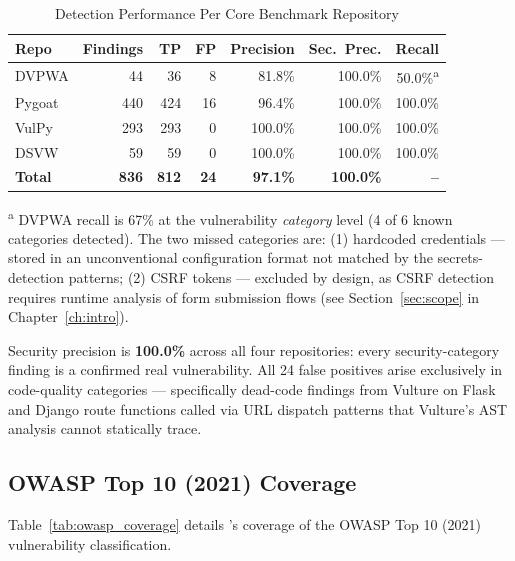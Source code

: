 \begin{table}[htbp]
\caption{Detection Performance Per Core Benchmark Repository}
\label{tab:per_repo_results}
\centering
\renewcommand{\arraystretch}{1.3}
\begin{tabular}{@{} l r r r r r r @{}}
\toprule
\textbf{Repo} & \textbf{Findings} & \textbf{TP} & \textbf{FP}
  & \textbf{Precision} & \textbf{Sec.\ Prec.} & \textbf{Recall} \\
\midrule
DVPWA    & 44  & 36  & 8  & 81.8\%  & 100.0\% & 50.0\%\textsuperscript{a} \\
Pygoat   & 440 & 424 & 16 & 96.4\%  & 100.0\% & 100.0\% \\
VulPy    & 293 & 293 & 0  & 100.0\% & 100.0\% & 100.0\% \\
DSVW     & 59  & 59  & 0  & 100.0\% & 100.0\% & 100.0\% \\
\midrule
\textbf{Total} & \textbf{836} & \textbf{812} & \textbf{24}
  & \textbf{97.1\%} & \textbf{100.0\%} & \textbf{--} \\
\bottomrule
\end{tabular}
\end{table}

\noindent\textsuperscript{a} DVPWA recall is 67\% at the vulnerability \emph{category} level (4 of 6 known categories detected). The two missed categories are: (1) hardcoded credentials --- stored in an unconventional configuration format not matched by the secrets-detection patterns; (2) CSRF tokens --- excluded by design, as CSRF detection requires runtime analysis of form submission flows (see Section~\ref{sec:scope} in Chapter~\ref{ch:intro}).

Security precision is \textbf{100.0\%} across all four repositories: every security-category finding is a confirmed real vulnerability. All 24 false positives arise exclusively in code-quality categories --- specifically dead-code findings from Vulture on Flask and Django route functions called via URL dispatch patterns that Vulture's AST analysis cannot statically trace.


\subsection{OWASP Top 10 (2021) Coverage}

Table~\ref{tab:owasp_coverage} details \ACRQA{}'s coverage of the OWASP Top 10 (2021) vulnerability classification.

